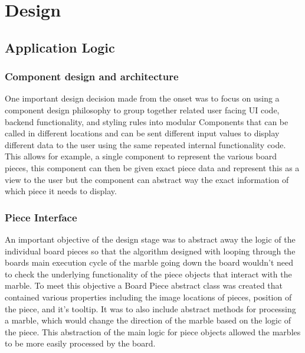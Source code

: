 \documentclass{l4proj}
\begin{document}
\chapter{Design}
\section{Application Logic}
\subsection{Component design and architecture}
One important design decision made from the onset was to focus on using a component design philosophy to group together related user facing UI code, backend functionality, and styling rules into modular Components that can be called in different locations and can be sent different input values to display different data to the user using the same repeated internal functionality code. This allows for example, a single component to represent the various board pieces, this component can then be given exact piece data and represent this as a view to the user but the component can abstract way the exact information of which piece it needs to display.

\subsection{Piece Interface}
An important objective of the design stage was to abstract away the logic of the individual board pieces so that the algorithm designed with looping through the boards main execution cycle of the marble going down the board wouldn't need to check the underlying functionality of the piece objects that interact with the marble. To meet this objective a Board Piece abstract class was created that contained various properties including the image locations of pieces, position of the piece, and it's tooltip. It was to also include abstract methods for processing a marble, which would change the direction of the marble based on the logic of the piece. This abstraction of the main logic for piece objects allowed the marbles to be more easily processed by the board.
\end{document}

